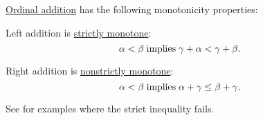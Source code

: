 \begin{proposition}\label{thm:ordinal_addition_is_monotone}
  \hyperref[def:ordinal_arithmetic/sum]{Ordinal addition} has the following monotonicity properties:
  \begin{thmenum}
     Left addition is \hyperref[eq:def:partially_ordered_set/homomorphism/strict]{strictly monotone}:
    \begin{equation}\label{eq:thm:ordinal_addition_is_monotone/left}
      \alpha < \beta \T{implies} \gamma + \alpha < \gamma + \beta.
    \end{equation}

     Right addition is \hyperref[eq:def:partially_ordered_set/homomorphism/nonstrict]{nonstrictly monotone}:
    \begin{equation}\label{eq:thm:ordinal_addition_is_monotone/right}
      \alpha < \beta \T{implies} \alpha + \gamma \leq \beta + \gamma.
    \end{equation}

    See  for examples where the strict inequality fails.
  \end{thmenum}
\end{proposition}
